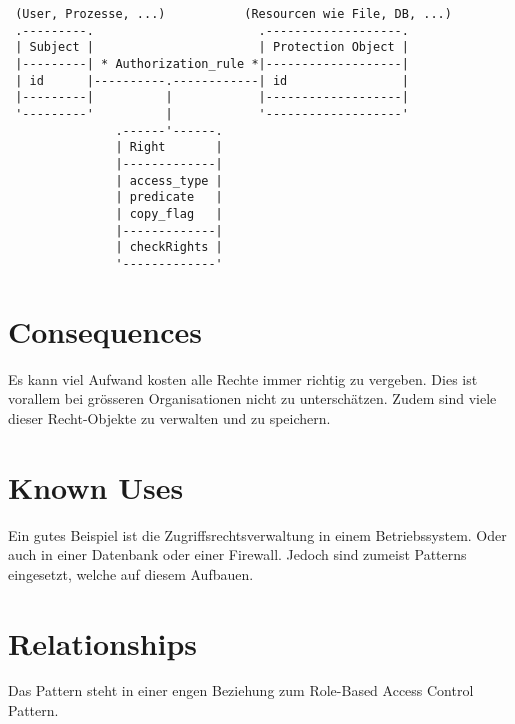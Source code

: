 \documentclass{article}
\begin{document}
\begin{samepage}
\begin{verbatim}
 (User, Prozesse, ...)           (Resourcen wie File, DB, ...)
 .---------.                       .-------------------.
 | Subject |                       | Protection Object |
 |---------| * Authorization_rule *|-------------------|
 | id      |----------.------------| id                |
 |---------|          |            |-------------------|
 '---------'          |            '-------------------'
               .------'------.
               | Right       |
               |-------------|
               | access_type |
               | predicate   |
               | copy_flag   |
               |-------------|
               | checkRights |
               '-------------'

\end{verbatim}
\end{samepage}

\section{Consequences}
Es kann viel Aufwand kosten alle Rechte immer richtig zu vergeben. Dies ist vorallem bei grösseren Organisationen nicht zu unterschätzen. Zudem sind viele dieser Recht-Objekte zu verwalten und zu speichern.


\section{Known Uses}
Ein gutes Beispiel ist die Zugriffsrechtsverwaltung in einem Betriebssystem.
Oder auch in einer Datenbank oder einer Firewall. Jedoch sind zumeist Patterns eingesetzt, welche auf diesem Aufbauen.

\section{Relationships}
Das Pattern steht in einer engen Beziehung zum Role-Based Access Control Pattern.




\end{document}
